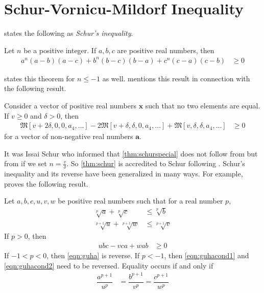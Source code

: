 \documentclass{subfile}
\begin{document}
	\section{Schur-Vornicu-Mildorf Inequality}\label{sec:sv}
	\textcite[Page $64$]{hardy_littlewood_polya_1934} states the following as \textit{Schur's inequality}.
		\begin{theorem}\label{thm:schur}
			Let $n$ be a positive integer. If $a,b,c$ are positive real numbers, then
				\begin{align*}
					a^{n}(a-b)(a-c)+b^{n}(b-c)(b-a)+c^{n}(c-a)(c-b)
						& \geq 0
				\end{align*}
		\end{theorem}
	\textcite[Page $217$]{barnard_child_2018} states this theorem for $n\leq -1$ as well. \textcite{hardy_littlewood_polya_1934} mentions this result in connection with the following result.
		\begin{theorem}\label{thm:schurspecial}
			Consider a vector of positive real numbers $\mathbf{x}$ such that no two elements are equal. If $v\geq 0$ and $\delta>0$, then
				\begin{align*}
					\mathfrak{M}[v+2\delta,0,0,a_{4},\ldots]-2\mathfrak{M}[v+\delta,\delta,0,a_{4},\ldots]+\mathfrak{M}[v,\delta,\delta,a_{4},\ldots]
						& \geq 0
				\end{align*}
			for a vector of non-negative real numbers $\mathbf{a}$.
		\end{theorem}
	It was Issai Schur who informed \textcite{hardy_littlewood_polya_1934} that \autoref{thm:schurspecial} does not follow from  but from  if we set $n=\frac{v}{\delta}$. So \autoref{thm:schur} is accredited to Schur following \textcite{watson_1955, watson_1956, neville_1956, wright_1956, oppenheim_1958}. Schur's inequality and its reverse have been generalized in many ways. For example, \textcite{guha_1962} proves the following result.
		\begin{theorem}\label{thm:guha}
			Let $a,b,c,u,v,w$ be positive real numbers such that for a real number $p$,
				\begin{align}
					\sqrt[p]{a}+\sqrt[p]{c}
						& \leq \sqrt[p]{b}\label{eqn:guhacond1}\\
					\sqrt[p+1]{u}+\sqrt[p+1]{w}
						& \leq \sqrt[p+1]{v}\label{eqn:guhacond2}
				\end{align}
			If $p>0$, then
				\begin{align}
					ubc-vca+wab
						& \geq 0\label{eqn:guha}
				\end{align}
			If $-1<p<0$, then \ref{eqn:guha} is reverse. If $p<-1$, then \ref{eqn:guhacond1} and \ref{eqn:guhacond2} need to be reversed. Equality occurs if and only if
				\begin{align*}
					\dfrac{a^{p+1}}{u^{p}}
						& = \dfrac{b^{p+1}}{v^{p}}=\dfrac{c^{p+1}}{w^{p}}
				\end{align*}
		\end{theorem}
\end{document}
